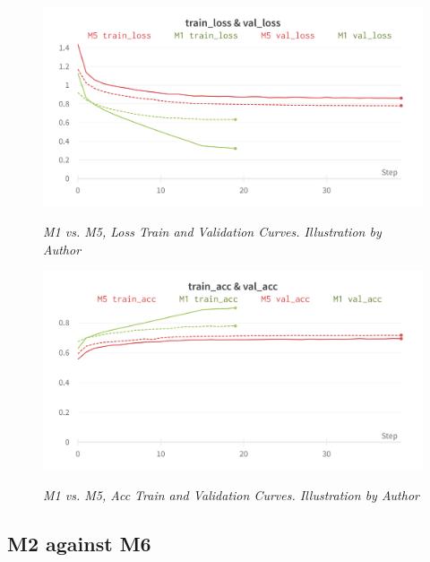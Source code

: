 \begin{figure}[H]
\centering
    \includegraphics[width=\textwidth]{imatges/results/LossM1M5.png}
\caption[M1 vs. M5, Loss Train and Validation Curves]{\textit{M1 vs. M5, Loss Train and Validation Curves. Illustration by Author}}
{\label{fig:lossm0m4}}
\end{figure}

\newpage

\begin{figure}[H]
\centering
    \includegraphics[width=\textwidth]{imatges/results/AccM1M5.png}
\caption[M1 vs. M5, Acc Train and Validation Curves]{\textit{M1 vs. M5, Acc Train and Validation Curves. Illustration by Author}}
{\label{fig:accm0m4}}
\end{figure}


\subsection{M2 against M6}

